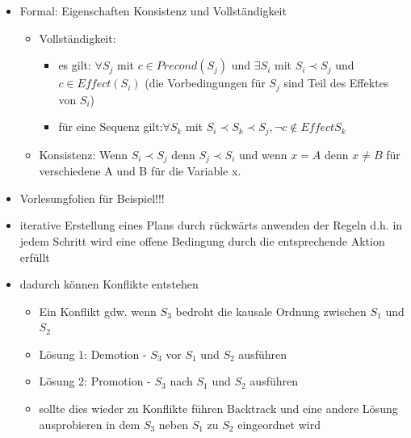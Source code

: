 \documentclass{article} %
\begin{document}
\begin{itemize}
\begin{itemize}
		\end{itemize}
		\item Formal: Eigenschaften Konsistenz und Vollständigkeit
		\begin{itemize}
			\item Vollständigkeit: 
			\begin{itemize}
				\item es gilt: $\forall S_{j}$ mit $c\in Precond(S_{j})$ und $\exists S_{i}$ mit $S_{i} \prec S_{j}$ und $c\in Effect(S_{i})$ (die Vorbedingungen für $S_{j}$ sind Teil des Effektes von $S_{i}$)
				\item für eine Sequenz gilt:$\forall S_{k}$ mit $S_{i} \prec S_{k} \prec S_{j}, \neg c \notin Effect S_{k}$
			\end{itemize} 
			\item Konsistenz: Wenn $S_{i} \prec S_{j}$ denn $S_{j} \prec S_{i}$ und wenn $x=A$ denn $x \neq B$ für verschiedene A und B für die Variable x.
		\end{itemize}
		\item Vorlesungfolien für Beispiel!!!
		\item iterative Erstellung eines Plans durch rückwärts anwenden der Regeln d.h. in jedem Schritt wird eine offene Bedingung durch die entsprechende Aktion erfüllt
		\item dadurch können Konflikte entstehen
		\begin{itemize}
			\item Ein Konflikt gdw. wenn $S_{3}$ bedroht die kausale Ordnung zwischen $S_{1}$ und $S_{2}$
			\item Lösung 1: Demotion - $S_{3}$ vor $S_{1}$ und $S_{2}$ ausführen
			\item Lösung 2: Promotion - $S_{3}$ nach $S_{1}$ und $S_{2}$ ausführen
			\item sollte dies wieder zu Konflikte führen Backtrack und eine andere Lösung ausprobieren in dem $S_{3}$ neben $S_{1}$ zu $S_{2}$ eingeordnet wird
		\end{itemize}
	\end{itemize}
\end{document}

